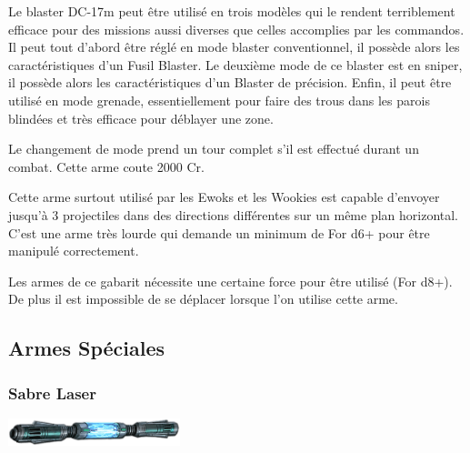 \begin{description}[align=left]
    \item [Fusil Blaster DC-17m]
        Le blaster DC-17m peut être utilisé en trois modèles qui le rendent terriblement efficace pour des missions aussi diverses que celles accomplies par les commandos. Il peut tout d'abord être réglé en mode blaster conventionnel, il possède alors les caractéristiques d'un Fusil Blaster. Le deuxième mode de ce blaster est en sniper, il possède alors les caractéristiques d'un Blaster de précision. Enfin, il peut être utilisé en mode grenade, essentiellement pour faire des trous dans les parois blindées et très efficace pour déblayer une zone.

        Le changement de mode prend un tour complet s'il est effectué durant un combat. Cette arme coute 2000 Cr.

    \item [Arbalète Laser]
        Cette arme surtout utilisé par les Ewoks et les Wookies est capable d'envoyer jusqu'à 3 projectiles dans des directions différentes sur un même plan horizontal. C'est une arme très lourde qui demande un minimum de For d6+ pour être manipulé correctement.

    \item [Canon blaster rotatif]
        Les armes de ce gabarit nécessite une certaine force pour être utilisé (For d8+). De plus il est impossible de se déplacer lorsque l'on utilise cette arme.
\end{description}

\clearpage
\subsection{Armes Spéciales}

\subsubsection{Sabre Laser}
\label{sec:sabre-laser}

\begin{flushright}
	\vspace{-5\baselineskip}
	\includegraphics[width=5cm, angle=-25]{img/equipement/lightsaber01.png}
	\vspace{-1\baselineskip}
\end{flushright}

